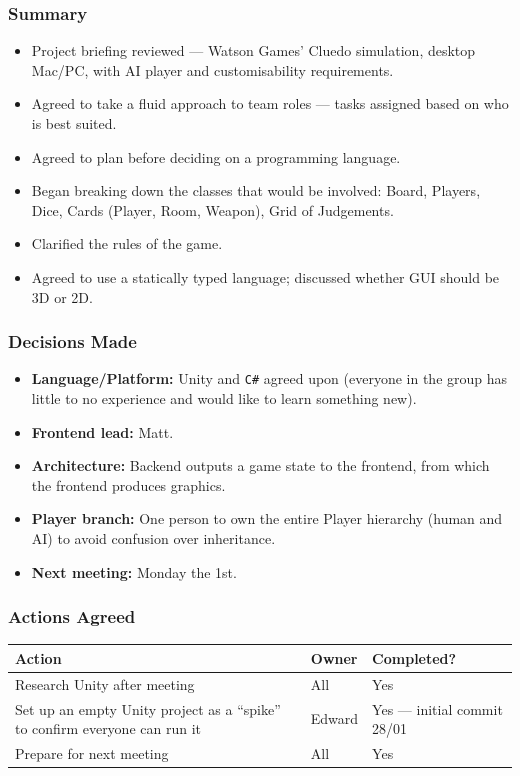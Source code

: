 \subsubsection*{Summary}
\begin{itemize}
    \item Project briefing reviewed --- Watson Games' Cluedo simulation, desktop Mac/PC, with AI player and customisability requirements.
    \item Agreed to take a fluid approach to team roles --- tasks assigned based on who is best suited.
    \item Agreed to plan before deciding on a programming language.
    \item Began breaking down the classes that would be involved: Board, Players, Dice, Cards (Player, Room, Weapon), Grid of Judgements.
    \item Clarified the rules of the game.
    \item Agreed to use a statically typed language; discussed whether GUI should be 3D or 2D.
\end{itemize}

\subsubsection*{Decisions Made}
\begin{itemize}
    \item \textbf{Language/Platform:} Unity and \texttt{C\#} agreed upon (everyone in the group has little to no experience and would like to learn something new).
    \item \textbf{Frontend lead:} Matt.
    \item \textbf{Architecture:} Backend outputs a game state to the frontend, from which the frontend produces graphics.
    \item \textbf{Player branch:} One person to own the entire Player hierarchy (human and AI) to avoid confusion over inheritance.
    \item \textbf{Next meeting:} Monday the 1st.
\end{itemize}

\subsubsection*{Actions Agreed}

\begin{table}[H]
\centering
\small
\begin{tabular}{|p{6cm}|p{1.8cm}|p{2.8cm}|}
\hline
\textbf{Action} & \textbf{Owner} & \textbf{Completed?} \\ \hline
Research Unity after meeting & All & Yes \\ \hline
Set up an empty Unity project as a ``spike'' to confirm everyone can run it & Edward & Yes --- initial commit 28/01 \\ \hline
Prepare for next meeting & All & Yes \\ \hline
\end{tabular}
\end{table}

